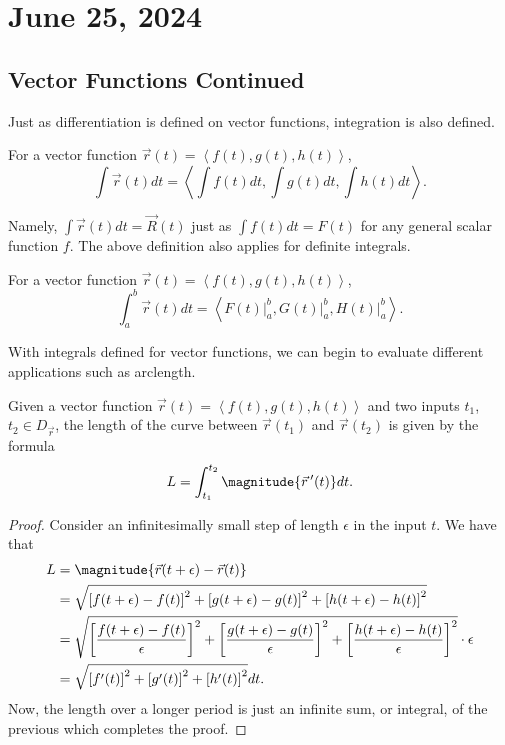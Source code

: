 \chapter{June 25, 2024}

\section{Vector Functions Continued}

Just as differentiation is defined on vector functions, integration is also defined.

\begin{proposition}
    For a vector function $\vec{r}(t) = \left<f(t), g(t), h(t)\right>$,
    \[\int \vec{r}(t)dt = \left<\int f(t)dt, \int g(t)dt, \int h(t)dt\right>.\]
\end{proposition}

Namely, $\int \vec{r}(t)dt = \vec{R}(t)$ just as $\int f(t)dt = F(t)$ for any general scalar function $f$. The above definition also applies for definite integrals.

\begin{proposition}
    For a vector function $\vec{r}(t) = \left<f(t), g(t), h(t)\right>$,
    \[\int_{a}^{b} \vec{r}(t)dt = \left<F(t) \biggr\vert_{a}^{b}, G(t) \biggr\vert_{a}^{b}, H(t) \biggr\vert_{a}^{b}\right>.\]
\end{proposition}

With integrals defined for vector functions, we can begin to evaluate different applications such as arclength.

\begin{theorem}
    Given a vector function $\vec{r}(t) = \left<f(t), g(t), h(t)\right>$ and two inputs $t_{1}$, $t_{2} \in D_{\vec{r}}$, the length of the curve between $\vec{r}(t_{1})$ and $\vec{r}(t_{2})$ is given by the formula
    \[L = \int_{t_{1}}^{t_{2}} \magnitude{\ddvec{r}(t)}dt.\]
\end{theorem}

\begin{proof}
    Consider an infinitesimally small step of length $\epsilon$ in the input $t$. We have that
    \begin{align*}
        L &= \magnitude{\vec{r}(t + \epsilon) - \vec{r}(t)} \\
        &= \sqrt{\left[f(t + \epsilon) - f(t)\right]^{2} + \left[g(t + \epsilon) - g(t)\right]^{2} + \left[h(t + \epsilon) - h(t)\right]^{2}} \\
        &= \sqrt{\left[\frac{f(t + \epsilon) - f(t)}{\epsilon}\right]^{2} + \left[\frac{g(t + \epsilon) - g(t)}{\epsilon}\right]^{2} + \left[\frac{h(t + \epsilon) - h(t)}{\epsilon}\right]^{2}} \cdot \epsilon \\
        &= \sqrt{\left[f'(t)\right]^{2} + \left[g'(t)\right]^{2} + \left[h'(t)\right]^{2}}dt.
    \end{align*}
    Now, the length over a longer period is just an infinite sum, or integral, of the previous which completes the proof.
\end{proof}

